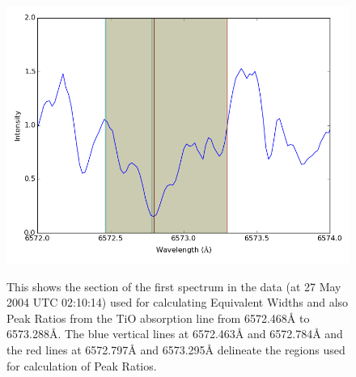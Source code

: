 \begin{figure}[!htbp]
\begin{center}
\includegraphics[scale=0.25]{Figures/tispec.png} \\
\end{center}   
\caption{This shows the section of the first spectrum in the {\harps} data (at 27 May 2004 UTC 02:10:14) used for
  calculating Equivalent Widths and also Peak Ratios from the TiO absorption line from 6572.468{\AA} to
  6573.288{\AA}. The blue vertical lines at 6572.463{\AA} and 6572.784{\AA} and the red lines at 6572.797{\AA} and
  6573.295{\AA} delineate the regions used for calculation of Peak Ratios.}
\protect\label{fig:tispec}
\end{figure}

